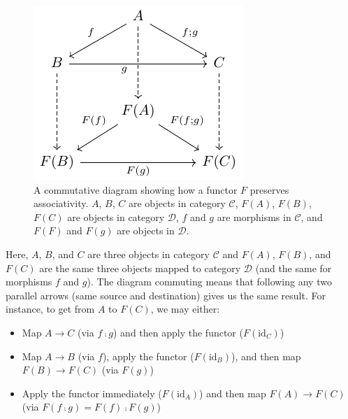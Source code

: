 \documentclass[
]{book}
\providecommand{\tightlist}{%
  \setlength{\itemsep}{0pt}\setlength{\parskip}{0pt}}
\theoremstyle{definition}
\theoremstyle{definition}
\theoremstyle{definition}
\theoremstyle{definition}
\theoremstyle{remark}
\begin{document}
\begin{figure}

{\centering \includegraphics[width=1\linewidth,height=1\textheight]{./figures/functor} 

}

\caption{A commutative diagram showing how a functor $F$ preserves associativity. $A$, $B$, $C$ are objects in category $\mathcal{C}$, $F(A)$, $F(B)$, $F(C)$ are objects in category $\mathcal{D}$, $f$ and $g$ are morphisms in $\mathcal{C}$, and $F(F)$ and $F(g)$ are objects in $\mathcal{D}$.}\label{fig:functor}
\end{figure}

Here, \(A\), \(B\), and \(C\) are three objects in category \(\mathcal{C}\) and \(F(A)\), \(F(B)\), and \(F(C)\) are the same three objects mapped to category \(\mathcal{D}\) (and the same for morphisms \(f\) and \(g\)). The diagram commuting means that following any two parallel arrows (same source and destination) gives us the same result. For instance, to get from \(A\) to \(F(C)\), we may either:

\begin{itemize}
\tightlist
\item
  Map \(A \to C\) (via \(f ⨾g\)) and then apply the functor (\(F(\text{id}_C)\))
\item
  Map \(A \to B\) (via \(f\)), apply the functor (\(F(\text{id}_B)\)), and then map \(F(B) \to F(C)\) (via \(F(g)\))
\item
  Apply the functor immediately (\(F(\text{id}_A)\)) and then map \(F(A) \to F(C)\) (via \(F(f ⨾g) = F(f) ⨾F(g)\))
\end{itemize}
\end{document}
